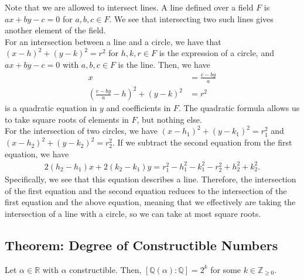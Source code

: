 \documentclass[10pt]{extarticle}
\newcommand{\Q}{\mathbb{Q}}
\newcommand{\Z}{\mathbb{Z}}
\newcommand{\R}{\mathbb{R}}
\begin{document}
  Note that we are allowed to intersect lines. A line defined over a field $F$ is $ax + by -c = 0$ for $a,b,c\in F$. We see that intersecting two such lines gives another element of the field.\\

  For an intersection between a line and a circle, we have that $(x-h)^2 + (y-k)^2 = r^2$ for $h,k,r\in F$ is the expression of a circle, and $ax+by-c = 0$ with $a,b,c\in F$ is the line. Then, we have
  \begin{align*}
    x &= \frac{c-by}{a}\\
    \left(\frac{c-by}{a}-h\right)^2 + \left(y-k\right)^2 &= r^2
  \end{align*}
  is a quadratic equation in $y$ and coefficients in $F$. The quadratic formula allows us to take square roots of elements in $F$, but nothing else.\\

  For the intersection of two circles, we have $(x-h_1)^2+(y-k_1)^2 = r_1^2$ and $(x-h_2)^2 + (y-k_2)^2 = r_2^2$. If we subtract the second equation from the first equation, we have
  \begin{align*}
    2(h_2-h_1)x + 2(k_2-k_1)y = r_1^2 -h_1^2 - k_1^2 - r_2^2 + h_2^2 + k_2^2.
  \end{align*}
  Specifically, we see that this equation describes a line. Therefore, the intersection of the first equation and the second equation reduces to the intersection of the first equation and the above equation, meaning that we effectively are taking the intersection of a line with a circle, so we can take at most square roots.
  \subsection{Theorem: Degree of Constructible Numbers}%
  Let $\alpha \in \R$ with $\alpha$ constructible. Then, $[\Q(\alpha):\Q] = 2^k$ for some $k\in \Z_{\geq 0}$.
\end{document}

